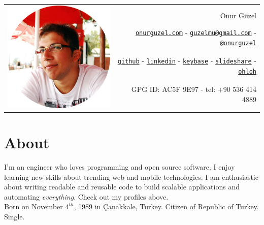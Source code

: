\documentclass[11pt,a4paper]{article}
\author{\name}
\title{\cv}
\def\name{Onur Güzel}
\begin{document}

\begin{tabularx}{\textwidth}{ X r }
\multirow{6}{*}{\includegraphics[scale=0.4]{photo}} & \\[0.5cm]
 & \Huge \name\\
 & \href{http://www.onurguzel.com/}{\tt onurguzel.com} - 
\href{mailto:guzelmu@gmail.com}{\tt guzelmu@gmail.com} - 
\href{http://onurguzel.com/twitter}{\tt @onurguzel}\\
 & \href{http://onurguzel.com/github}{\tt github} - 
\href{http://linkedin.com/in/guzelmu}{\tt linkedin} - 
\href{https://keybase.io/onurguzel}{\tt keybase} - 
\href{http://www.slideshare.net/onurguzel}{\tt slideshare} - 
\href{http://www.ohloh.net/accounts/onurguzel}{\tt ohloh}\\
 & GPG ID: AC5F 9E97 - tel: +90 536 414 4889\\
 & \\[0.5cm]
\end{tabularx}

\section*{About}
I'm an engineer who loves programming and open source software. I enjoy learning new skills about trending web and mobile technologies. I am enthusiastic about writing readable and reusable code to build scalable applications and automating \textit{everything}. Check out my profiles above.\\[10pt]
Born on November $4^{th}$, 1989 in Çanakkale, Turkey. Citizen of Republic of Turkey. Single.
\end{document}

